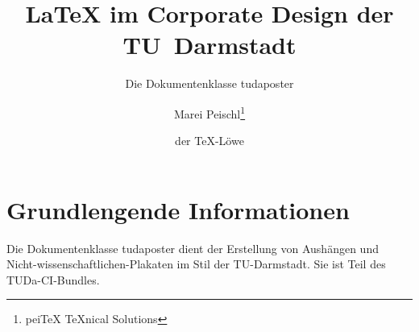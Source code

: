\documentclass[
	paper=a0,
	ngerman,
	accentcolor=9c,
	logo=body,%
	footer=true,
	]{tudaposter}
\begin{document}
\title{\LaTeX{} im Corporate Design der TU~Darmstadt}
\subtitle{Die Dokumentenklasse tudaposter}
\author{Marei Peischl\thanks{pei\TeX{} \TeX{}nical Solutions}\and der \TeX-Löwe}

\titlegraphic{\color{red!20}\rule{\contentwidth}{.5\contentheight}}



\maketitle

\section*{Grundlengende Informationen}
Die Dokumentenklasse tudaposter dient der Erstellung von Aushängen und Nicht-wissenschaftlichen-Plakaten im Stil der TU-Darmstadt. Sie ist Teil des TUDa-CI-Bundles.
\end{document}
